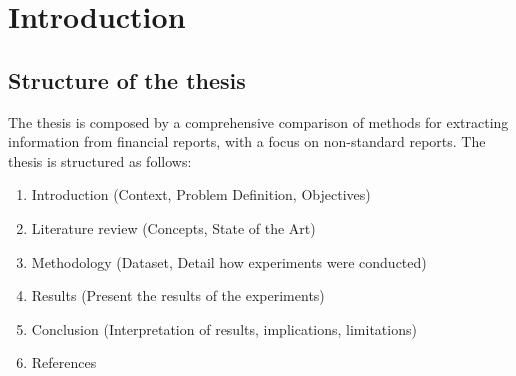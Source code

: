 \documentclass[english, 12pt, a4paper, elec, utf8, a-2b, online]{aaltothesis}
\begin{document}
\begin{acronym}
\end{acronym}


\newpage
\section{Introduction}
\label{sec:intro}

\thispagestyle{empty}

\subsection{Structure of the thesis}

The thesis is composed by a comprehensive comparison of methods for extracting information from financial reports, with a focus on non-standard reports. The thesis is structured as follows:

\begin{enumerate}
    \item \label{list:intro} Introduction (Context, Problem Definition, Objectives)
    \item Literature review (Concepts, State of the Art)
    \item Methodology (Dataset, Detail how experiments were conducted)
    \item Results (Present the results of the experiments)
    \item Conclusion (Interpretation of results, implications, limitations)
    \item References
\end{enumerate}
\end{document}

